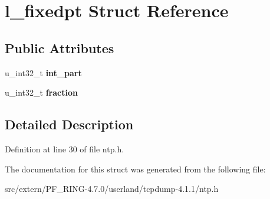 \hypertarget{structl__fixedpt}{
\section{l\_\-fixedpt Struct Reference}
\label{structl__fixedpt}
}
\subsection*{Public Attributes}
\begin{DoxyCompactItemize}
\item 
\hypertarget{structl__fixedpt_add6fe74e497ee83e85d54c5f41187b07}{
u\_\-int32\_\-t {\bfseries int\_\-part}}
\label{structl__fixedpt_add6fe74e497ee83e85d54c5f41187b07}

\item 
\hypertarget{structl__fixedpt_ac8b1a4b73ca64e18aba33ee489fc19a2}{
u\_\-int32\_\-t {\bfseries fraction}}
\label{structl__fixedpt_ac8b1a4b73ca64e18aba33ee489fc19a2}

\end{DoxyCompactItemize}


\subsection{Detailed Description}


Definition at line 30 of file ntp.h.



The documentation for this struct was generated from the following file:\begin{DoxyCompactItemize}
\item 
src/extern/PF\_\-RING-\/4.7.0/userland/tcpdump-\/4.1.1/ntp.h\end{DoxyCompactItemize}
